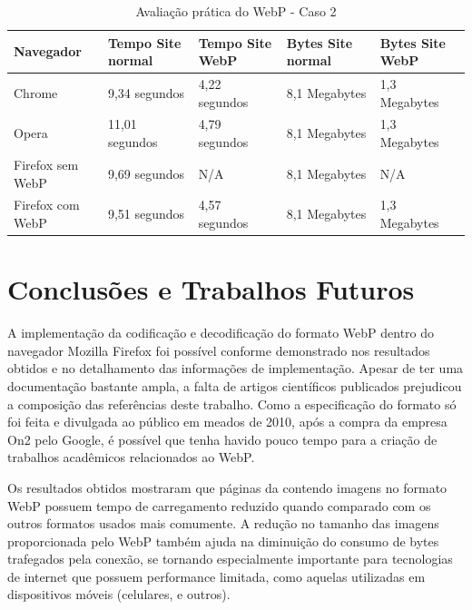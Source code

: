 \documentclass[espaco=simples,appendix=Name]{abnt}
\begin{document}
\begin{table}[ht]
        \centering
        \caption{Avaliação prática do WebP - Caso 2
        \label{tbl:padc}}{
                \begin{tabular}{|l|p{3cm}|p{3cm}|l|p{2cm}|}
                \hline
                        \textbf{Navegador} & \textbf{Tempo Site normal} & \textbf{Tempo Site WebP} & \textbf{Bytes Site normal} & \textbf{Bytes Site WebP} \\
                        \hline
                        Chrome			&  9,34 segundos	& 4,22 segundos		& 8,1 Megabytes		& 1,3 Megabytes \\
                        \hline
						Opera			&  11,01 segundos	& 4,79 segundos		& 8,1 Megabytes		& 1,3 Megabytes \\
						\hline
                        Firefox sem WebP	&  9,69 segundos	& N/A			& 8,1 Megabytes		& N/A \\
                        \hline
                        Firefox com WebP	&  9,51 segundos	& 4,57 segundos		& 8,1 Megabytes		& 1,3 Megabytes \\
                        \hline
                \end{tabular}
                }
\end{table}

\chapter{Conclusões e Trabalhos Futuros}

A implementação da codificação e decodificação do formato WebP dentro do navegador Mozilla Firefox foi possível conforme demonstrado nos resultados obtidos e no detalhamento das informações de implementação. Apesar de ter uma documentação bastante ampla, a falta de artigos científicos publicados prejudicou a composição das referências deste trabalho. Como a especificação do formato só foi feita e divulgada ao público em meados de 2010, após a compra da empresa On2 pelo Google, é possível que tenha havido pouco tempo para a criação de trabalhos acadêmicos relacionados ao WebP.

Os resultados obtidos mostraram que páginas da  contendo imagens no formato WebP possuem tempo de carregamento reduzido quando comparado com os outros formatos usados mais comumente. A redução no tamanho das imagens proporcionada pelo WebP também ajuda na diminuição do consumo de bytes trafegados pela conexão, se tornando especialmente importante para tecnologias de internet que possuem performance limitada, como aquelas utilizadas em dispositivos móveis (celulares,  e outros). 
\end{document}
